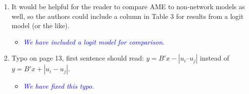 \begin{enumerate}
	\item It would be helpful for the reader to compare AME to non-network models as well, so the authors could include a column in Table 3 for results from a logit model (or the like). 
	\begin{itemize}
		\item \textcolor{blue}{ \emph{
		We have included a logit model for comparison.
		}}
	\end{itemize}		
	\item Typo on page 13, first sentence should read: $y = B'x - |u_i – u_j|$ instead of $y = B'x + |u_i - u_j|$.
	\begin{itemize}
		\item \textcolor{blue}{ \emph{
		We have fixed this typo.
		}}
	\end{itemize}		
\end{enumerate}

